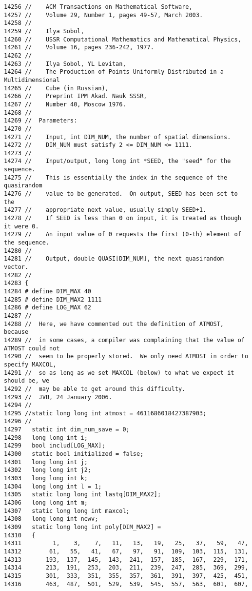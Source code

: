 \begin{Code}
\begin{verbatim}
14256 //    ACM Transactions on Mathematical Software,
14257 //    Volume 29, Number 1, pages 49-57, March 2003.
14258 //
14259 //    Ilya Sobol,
14260 //    USSR Computational Mathematics and Mathematical Physics,
14261 //    Volume 16, pages 236-242, 1977.
14262 //
14263 //    Ilya Sobol, YL Levitan, 
14264 //    The Production of Points Uniformly Distributed in a Multidimensional 
14265 //    Cube (in Russian),
14266 //    Preprint IPM Akad. Nauk SSSR, 
14267 //    Number 40, Moscow 1976.
14268 //
14269 //  Parameters:
14270 //
14271 //    Input, int DIM_NUM, the number of spatial dimensions.
14272 //    DIM_NUM must satisfy 2 <= DIM_NUM <= 1111.
14273 //
14274 //    Input/output, long long int *SEED, the "seed" for the sequence.
14275 //    This is essentially the index in the sequence of the quasirandom
14276 //    value to be generated.  On output, SEED has been set to the
14277 //    appropriate next value, usually simply SEED+1.
14278 //    If SEED is less than 0 on input, it is treated as though it were 0.
14279 //    An input value of 0 requests the first (0-th) element of the sequence.
14280 //
14281 //    Output, double QUASI[DIM_NUM], the next quasirandom vector.
14282 //
14283 {
14284 # define DIM_MAX 40
14285 # define DIM_MAX2 1111
14286 # define LOG_MAX 62
14287 //
14288 //  Here, we have commented out the definition of ATMOST, because
14289 //  in some cases, a compiler was complaining that the value of ATMOST could not
14290 //  seem to be properly stored.  We only need ATMOST in order to specify MAXCOL,
14291 //  so as long as we set MAXCOL (below) to what we expect it should be, we
14292 //  may be able to get around this difficulty.
14293 //  JVB, 24 January 2006.
14294 //
14295 //static long long int atmost = 4611686018427387903;
14296 //
14297   static int dim_num_save = 0;
14298   long long int i;
14299   bool includ[LOG_MAX];
14300   static bool initialized = false;
14301   long long int j;
14302   long long int j2;
14303   long long int k;
14304   long long int l = 1;
14305   static long long int lastq[DIM_MAX2];
14306   long long int m;
14307   static long long int maxcol;
14308   long long int newv;
14309   static long long int poly[DIM_MAX2] =
14310   {
14311         1,    3,    7,   11,   13,   19,   25,   37,   59,   47,
14312        61,   55,   41,   67,   97,   91,  109,  103,  115,  131,
14313       193,  137,  145,  143,  241,  157,  185,  167,  229,  171,
14314       213,  191,  253,  203,  211,  239,  247,  285,  369,  299,
14315       301,  333,  351,  355,  357,  361,  391,  397,  425,  451,
14316       463,  487,  501,  529,  539,  545,  557,  563,  601,  607,

\end{verbatim}
\end{Code}
